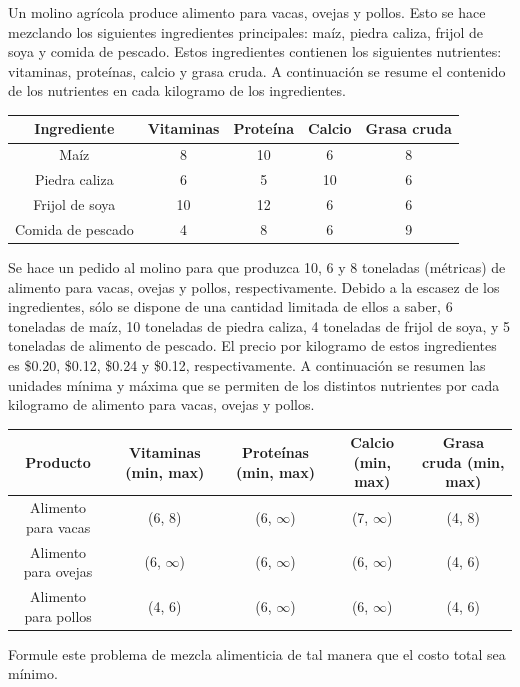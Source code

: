 \begin{Ejer}
Un molino agr\'icola produce alimento para vacas, ovejas y pollos. Esto se hace mezclando los siguientes ingredientes principales: ma\'iz, piedra caliza, frijol de soya y comida de pescado. Estos ingredientes contienen los siguientes nutrientes: vitaminas, prote\'inas, calcio y grasa cruda. A continuaci\'on se resume el contenido de los nutrientes en cada kilogramo de los ingredientes.

\begin{center}
\begin{tabular}{c|cccc}
Ingrediente & Vitaminas & Prote\'ina & Calcio & Grasa cruda \\
\hline
Ma\'iz & 8 & 10 & 6 & 8 \\
Piedra caliza & 6 & 5 & 10 & 6 \\
Frijol de soya & 10 & 12 & 6 & 6 \\
Comida de pescado & 4 & 8 & 6 & 9 \\
\end{tabular}
\end{center}

Se hace un pedido al molino para que produzca 10, 6 y 8 toneladas (m\'etricas) de alimento para vacas, ovejas y pollos, respectivamente. Debido a la escasez de los ingredientes, s\'olo se dispone de una cantidad limitada de ellos a saber, 6 toneladas de ma\'iz, 10 toneladas de piedra caliza, 4 toneladas de frijol de soya, y 5 toneladas de alimento de pescado. El precio por kilogramo de estos ingredientes es \$0.20, \$0.12, \$0.24 y \$0.12, respectivamente. A continuaci\'on se resumen las unidades m\'inima y m\'axima que se permiten de los distintos nutrientes por cada kilogramo de alimento para vacas, ovejas y pollos.

\begin{center}
\begin{tabular}{c|cccc}
Producto & Vitaminas (min, max) & Prote\'inas (min, max) & Calcio (min, max) & Grasa cruda (min, max) \\
\hline
Alimento para vacas & (6, 8) & (6, $\infty$) & (7, $\infty$) & (4, 8) \\
Alimento para ovejas & (6, $\infty$) & (6, $\infty$) & (6, $\infty$) & (4, 6) \\
Alimento para pollos & (4, 6) & (6, $\infty$) & (6, $\infty$) & (4, 6) \\
\end{tabular}
\end{center}

Formule este problema de mezcla alimenticia de tal manera que el costo total sea m\'inimo.
\end{Ejer}

